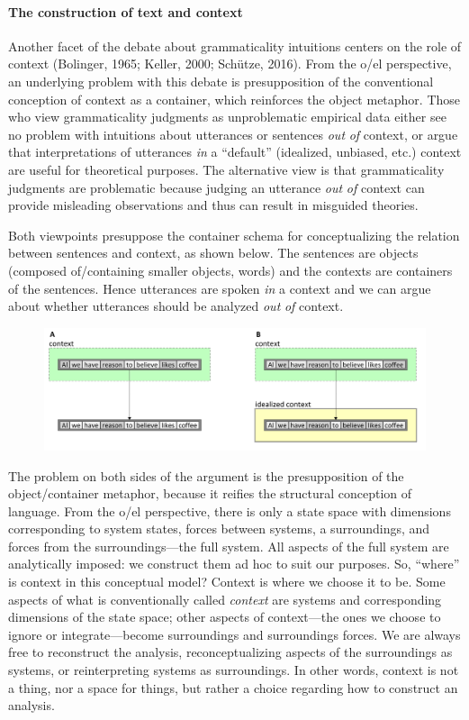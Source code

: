 \paragraph{The construction of text and context}

Another facet of the debate about grammaticality intuitions centers on the role of context (Bolinger, 1965; Keller, 2000; Schütze, 2016). From the o/el perspective, an underlying problem with this debate is presupposition of the conventional conception of context as a container, which reinforces the object metaphor. Those who view grammaticality judgments as unproblematic empirical data either  see no problem with intuitions about utterances or sentences \textit{out} \textit{of} context, or  argue that interpretations of utterances \textit{in} a “default” (idealized, unbiased, etc.) context are useful for theoretical purposes. The alternative view is that grammaticality judgments are problematic because judging an utterance \textit{out} \textit{of} context can provide misleading observations and thus can result in misguided theories.

  Both viewpoints presuppose the container schema for conceptualizing the relation between sentences and context, as shown below. The sentences are objects (composed of/containing smaller objects, words) and the contexts are containers of the sentences. Hence utterances are spoken \textit{in} a context and we can argue about whether utterances should be analyzed \textit{out} \textit{of} context.   

  
\begin{figure}
\includegraphics[width=\textwidth]{figures/Tilsen-img120.png}
\caption{\missingcaption}
\label{fig:}
\end{figure}
 

  The problem on both sides of the argument is the presupposition of the object/container metaphor, because it reifies the structural conception of language. From the o/el perspective, there is only a state space with dimensions corresponding to system states, forces between systems, a surroundings, and forces from the surroundings—the full system. All aspects of the full system are analytically imposed: we construct them ad hoc to suit our purposes. So, “where” is context in this conceptual model? Context is where we choose it to be. Some aspects of what is conventionally called \textit{context} are systems and corresponding dimensions of the state space; other aspects of context—the ones we choose to ignore or integrate—become surroundings and surroundings forces. We are always free to reconstruct the analysis, reconceptualizing aspects of the surroundings as systems, or reinterpreting systems as surroundings. In other words, context is not a thing, nor a space for things, but rather a choice regarding how to construct an analysis.

